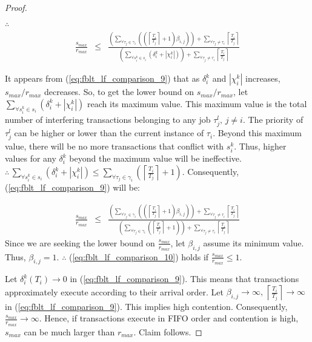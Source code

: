 \documentclass[a4paper,english]{article}
\newtheorem{proof}{Proof}
\begin{document}
\begin{proof}
\begin{eqnarray}
\end{eqnarray}
$\therefore$
\begin{eqnarray}
\frac{s_{max}}{r_{max}} & \le & \frac{\left(\sum_{\forall\tau_{j}\in\gamma_{i}}\left(\left(\left\lceil \frac{T_{i}}{T_{j}}\right\rceil +1\right)\beta_{i,j}\right)\right)+\sum_{\forall\tau_{j}\neq\tau_{i}}\left\lceil \frac{T_{i}}{T_{j}}\right\rceil }{\left(\sum_{\forall s_{i}^{k}\in s_{i}}\left(\delta_{i}^{k}+|\chi_{i}^{k}|\right)\right)+\sum_{\forall\tau_{j}\neq\tau_{i}}\left\lceil \frac{T_{i}}{T_{j}}\right\rceil }\label{eq:fblt_lf_comparison_9}
\end{eqnarray}



It appears from (\ref{eq:fblt_lf_comparison_9}) that as $\delta_{i}^{k}$ and $|\chi_{i}^{k}|$ increases, $s_{max}/r_{max}$ decreases.
So, to get the lower bound on $s_{max}/r_{max}$, let $\sum_{\forall s_{i}^{k}\in s_{i}}\left(\delta_{i}^{k}+|\chi_{i}^{k}|\right)$
reach its maximum value. This maximum value is the total number
of interfering transactions belonging to any job $\tau_{j}^{l},\, j\ne i$.
The priority of $\tau_{j}^{l}$ can be higher or lower than the current instance
of $\tau_{i}$. Beyond this maximum value, there will be no more transactions that conflict with $s_{i}^{k}$. Thus, higher values for any $\delta_{i}^{k}$
beyond the maximum value will be ineffective. $\therefore\,\sum_{\forall s_{i}^{k}\in s_{i}}\left(\delta_{i}^{k}+|\chi_{i}^{k}|\right)\le\sum_{\forall\tau_{j}\in\gamma_{i}}\left(\left\lceil \frac{T_{i}}{T_{j}}\right\rceil +1\right)$.
Consequently, (\ref{eq:fblt_lf_comparison_9}) will be:

\begin{eqnarray}
\frac{s_{max}}{r_{max}} & \le & \frac{\left(\sum_{\forall\tau_{j}\in\gamma_{i}}\left(\left(\left\lceil \frac{T_{i}}{T_{j}}\right\rceil +1\right)\beta_{i,j}\right)\right)+\sum_{\forall\tau_{j}\neq\tau_{i}}\left\lceil \frac{T_{i}}{T_{j}}\right\rceil }{\left(\sum_{\forall\tau_{j}\in\gamma_{i}}\left(\left\lceil \frac{T_{i}}{T_{j}}\right\rceil +1\right)\right)+\sum_{\forall\tau_{j}\neq\tau_{i}}\left\lceil \frac{T_{i}}{T_{j}}\right\rceil }\label{eq:fblt_lf_comparison_10}
\end{eqnarray}
Since we are seeking the lower bound on $\frac{s_{max}}{r_{max}}$, let
$\beta_{i,j}$ assume its minimum value. Thus, $\beta_{i,j}=1$. $\therefore$
(\ref{eq:fblt_lf_comparison_10}) holds if $\frac{s_{max}}{r_{max}}\le1$.

Let $\delta_{i}^{k}(T_{i})\rightarrow0$ in (\ref{eq:fblt_lf_comparison_9}).
This means that transactions approximately execute according to their arrival order.
Let $\beta_{i,j}\rightarrow\infty,\,\left\lceil \frac{T_{i}}{T_{j}}\right\rceil \rightarrow\infty$
in (\ref{eq:fblt_lf_comparison_9}). This implies high contention.
Consequently, $\frac{s_{max}}{r_{max}}\rightarrow\infty$. Hence, if
transactions execute in FIFO order and contention is high, $s_{max}$
can be much larger than $r_{max}$. Claim follows.
\end{proof}
\end{document}
